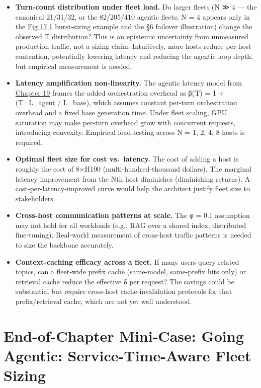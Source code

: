 \begin{itemize}
\tightlist
\item
  \textbf{Turn-count distribution under fleet load.} Do larger fleets (N
  ≫ 4 --- the canonical 21/31/32, or the 82/205/410 agentic fleets; N =
  4 appears only in the \hyperref[fig:17.1]{Fig 17.1} burst-sizing example and the §6
  failover illustration) change the observed T distribution? This is an
  epistemic uncertainty from unmeasured production traffic, not a sizing
  claim. Intuitively, more hosts reduce per-host contention, potentially
  lowering latency and reducing the agentic loop depth, but empirical
  measurement is needed.
\item
  \textbf{Latency amplification non-linearity.} The agentic latency
  model from \hyperref[chap:19]{Chapter 19} frames the added orchestration overhead as β(T)
  = 1 + (T·L\_agent / L\_base), which assumes constant per‑turn
  orchestration overhead and a fixed base generation time. Under fleet
  scaling, GPU saturation may make per‑turn overhead grow with
  concurrent requests, introducing convexity. Empirical load‑testing
  across N = 1, 2, 4, 8 hosts is required.
\item
  \textbf{Optimal fleet size for cost vs.~latency.} The cost of adding a
  host is roughly the cost of 8×H100 (multi‑hundred-thousand dollars).
  The marginal latency improvement from the Nth host diminishes
  (diminishing returns). A cost‑per‑latency‑improved curve would help
  the architect justify fleet size to stakeholders.
\item
  \textbf{Cross‑host communication patterns at scale.} The φ = 0.1
  assumption may not hold for all workloads (e.g., RAG over a shared
  index, distributed fine‑tuning). Real‑world measurement of cross‑host
  traffic patterns is needed to size the backbone accurately.
\item
  \textbf{Context‑caching efficacy across a fleet.} If many users query
  related topics, can a fleet‑wide prefix cache (same-model, same-prefix
  hits only) or retrieval cache reduce the effective δ per request? The
  savings could be substantial but require cross-host cache-invalidation
  protocols for that prefix/retrieval cache, which are not yet well
  understood.
\end{itemize}

\section{End-of-Chapter Mini-Case: Going Agentic: Service-Time-Aware
Fleet
Sizing}\label{end-of-chapter-mini-case-going-agentic-service-time-aware-fleet-sizing}

